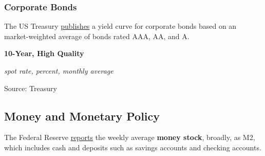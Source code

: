 \documentclass{report}
\makeatletter
\newcommand{\tbllink}[1]{\href{https://raw.githubusercontent.com/bdecon/US-chartbook/master/chartbook/data/#1}{\faTable}}
\newcommand*\short[1]{\expandafter\@gobbletwo\number\numexpr#1\relax}
\newcommand{\shdateaxisticks}{
		date coordinates in=x, axis line style={draw=none},
		xmax={2021-01-01},
		max space between ticks=40,	    
		xtick={{1990-01-01}, {1995-01-01}, {2000-01-01}, 
			{2005-01-01}, {2010-01-01}, {2015-01-01}, {2020-01-01}},
		minor xtick={},
		enlarge y limits={0.06}, enlarge x limits={0.01},
		}
\newcommand{\bbar}[2]{extra #1 ticks = {{#2}}, extra #1 tick labels = ,
		extra #1 tick style = {grid=major, grid style={thick, black!25}},}
\newcommand{\stdline}[4]{\addplot[very thick, no markers, color=#1] 
		table [x=#2, y=#3, col sep=comma] {#4};	}
\newcommand{\rbars}{
		\fill[color=black!10] (axis cs:{1990-07-01},\pgfkeysvalueof{/pgfplots/ymin}) rectangle 
			(axis cs:{1991-03-01}, \pgfkeysvalueof{/pgfplots/ymax});
		\fill[color=black!10] (axis cs:{2007-12-01},\pgfkeysvalueof{/pgfplots/ymin}) rectangle 
			(axis cs:{2009-07-01}, \pgfkeysvalueof{/pgfplots/ymax});
		\fill[color=black!10] (axis cs:{2001-03-01},\pgfkeysvalueof{/pgfplots/ymin}) rectangle 
			(axis cs:{2001-11-01}, \pgfkeysvalueof{/pgfplots/ymax});
		\fill[color=black!10] (axis cs:{2020-02-01},\pgfkeysvalueof{/pgfplots/ymin}) rectangle 
			(axis cs:{2020-09-01}, \pgfkeysvalueof{/pgfplots/ymax});}
\makeatother
\begin{document}
{{{{{{{{{\vspace{7mm}

\subsubsection*{\color{black!70} \seriffont Corporate Bonds}
\begin{minipage}{0.27\textwidth}
\small The US Treasury \href{https://www.treasury.gov/resource-center/economic-policy/corp-bond-yield/Pages/Corp-Yield-Bond-Curve-Papers.aspx}{publishes} a yield curve for corporate bonds based on an market-weighted average of bonds rated AAA, AA, and A. 

\end{minipage}\hspace{8mm} \begin{minipage}{0.43\textwidth}
\normalsize \textbf{10-Year, High Quality}

\footnotesize{\textit{spot rate, percent, monthly average}}

\hspace*{-2mm} 

\footnotesize{Source: Treasury} \hfill \tbllink{hqcb.csv}

\end{minipage}



\newpage

\begin{minipage}{0.76\textwidth}

\subsection*{\color{black!70} \seriffont Money and Monetary Policy}

\small The Federal Reserve \href{https://www.federalreserve.gov/releases/h6/current/default.htm}{reports} the weekly average \textbf{money stock}, broadly, as M2, which includes cash and deposits such as savings accounts and checking accounts. \\


\end{minipage}}}}}}}}}}
\end{document}
